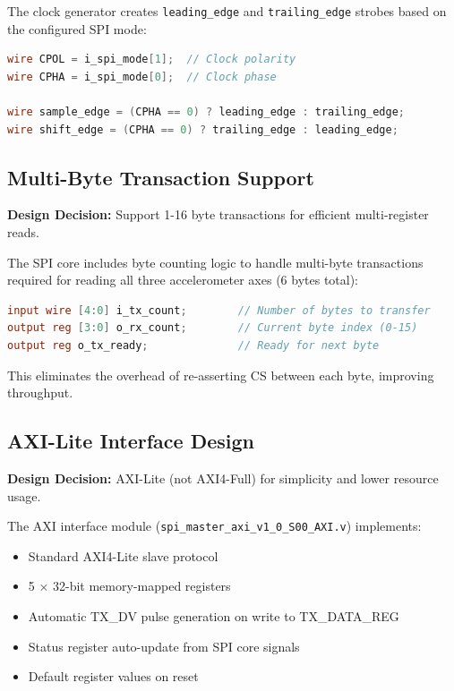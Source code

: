 \documentclass[11pt,a4paper]{article}
\begin{document}
The clock generator creates \texttt{leading\_edge} and \texttt{trailing\_edge} strobes based on the configured SPI mode:

\begin{lstlisting}[language=Verilog, caption=SPI Mode Configuration]
wire CPOL = i_spi_mode[1];  // Clock polarity
wire CPHA = i_spi_mode[0];  // Clock phase

wire sample_edge = (CPHA == 0) ? leading_edge : trailing_edge;
wire shift_edge = (CPHA == 0) ? trailing_edge : leading_edge;
\end{lstlisting}

\subsection{Multi-Byte Transaction Support}

\textbf{Design Decision:} Support 1-16 byte transactions for efficient multi-register reads.

The SPI core includes byte counting logic to handle multi-byte transactions required for reading all three accelerometer axes (6 bytes total):

\begin{lstlisting}[language=Verilog, caption=Byte Counter Logic]
input wire [4:0] i_tx_count;        // Number of bytes to transfer
output reg [3:0] o_rx_count;        // Current byte index (0-15)
output reg o_tx_ready;              // Ready for next byte
\end{lstlisting}

This eliminates the overhead of re-asserting CS between each byte, improving throughput.

\subsection{AXI-Lite Interface Design}

\textbf{Design Decision:} AXI-Lite (not AXI4-Full) for simplicity and lower resource usage.

The AXI interface module (\texttt{spi\_master\_axi\_v1\_0\_S00\_AXI.v}) implements:

\begin{itemize}
    \item Standard AXI4-Lite slave protocol
    \item 5 × 32-bit memory-mapped registers
    \item Automatic TX\_DV pulse generation on write to TX\_DATA\_REG
    \item Status register auto-update from SPI core signals
    \item Default register values on reset
\end{itemize}
\end{document}
